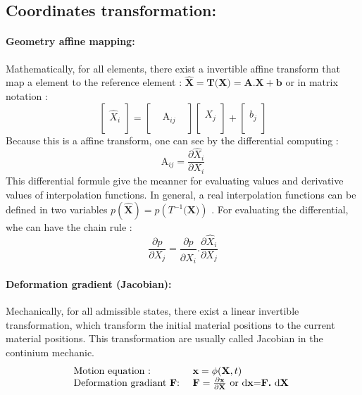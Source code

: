 \documentclass[a4paper,10pt]{article}
\begin{document}
\subsection{Coordinates transformation: }
\paragraph{Geometry affine mapping: }
Mathematically, for all elements, there exist a invertible affine transform that map a element to the reference element : $ \hat{\textbf{X}} = \textbf{T(X)} =\textbf{A.X} + \textbf{b}$ or in matrix notation :
\[
\left[
\begin{array}{c}
               \\
    \hat{X}_i  \\
               \\
\end{array}
\right]
=
\left[
\begin{array}{ccc}
  &                 & \\
  &  \text{A}_{ij}  & \\
  &                 & 
\end{array}
\right]
\left[
\begin{array}{c}
         \\
    X_j  \\
         \\     
\end{array}
\right]
+
\left[
\begin{array}{c}
         \\
    b_j  \\
         \\      
\end{array}
\right]
\]
Because this is a affine transform, one can see by the differential computing :
\[
\text{A}_{ij} = \frac{\partial \hat{X}_i }{\partial X_i} 
\]
This differential formule give the meanner for evaluating values and derivative values of interpolation functions. In general, a real interpolation functions can be defined in two variables $p(\hat{\textbf{X}}) = p(T^{-1}\textbf{(X)})$ . For evaluating the differential, whe can have the chain rule :   
\[
  \frac{\partial p}{\partial X_j}  = \frac{\partial p}{\partial \hat{X}_i } . \frac{\partial \hat{X}_i }{\partial X_j}
\]

\paragraph{Deformation gradient (Jacobian): }
Mechanically, for all admissible states, there exist a linear invertible transformation, which transform the initial material positions to the current material positions. This transformation are usually called Jacobian in the continium mechanic.
 \[
\begin{array}{ll}
\text{Motion equation                : } & \textbf{x}=\phi(\textbf{X},t) \\
\text{Deformation gradiant \textbf{F}: } & \textbf{F}=\frac{\partial \textbf{x}}{\partial \textbf{X}}  \text{   or d\textbf{x}=\textbf{F.} d\textbf{X} }
\end{array}
\]
\end{document}
